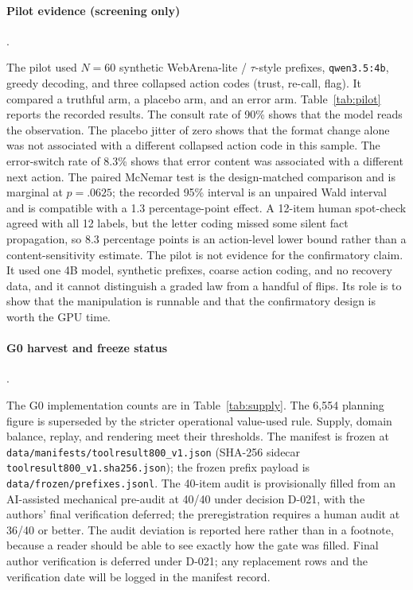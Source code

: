 \documentclass[a4paper,fleqn]{cas-sc}
\begin{document}
\paragraph{Pilot evidence (screening only)}.\ \label{sec:pilot}

The pilot used $N=60$ synthetic WebArena-lite / $\tau$-style prefixes, \texttt{qwen3.5:4b}, greedy
decoding, and three collapsed action codes (trust, re-call, flag). It compared a truthful arm, a
placebo arm, and an error arm. Table~\ref{tab:pilot} reports the recorded results. The consult
rate of 90\% shows that the model reads the observation. The placebo jitter of zero shows that
the format change alone was not associated with a different collapsed action code in this sample. The error-switch
rate of 8.3\% shows that error content was associated with a different next action. The paired McNemar test is the
design-matched comparison and is marginal at $p=.0625$; the recorded 95\% interval is an unpaired
Wald interval and is compatible with a 1.3 percentage-point effect. A 12-item human spot-check
agreed with all 12 labels, but the letter coding missed some silent fact propagation, so 8.3
percentage points is an action-level lower bound rather than a content-sensitivity estimate.
The pilot is not evidence for the confirmatory claim. It used one 4B model, synthetic prefixes,
coarse action coding, and no recovery data, and it cannot distinguish a graded law from a handful
of flips. Its role is to show that the manipulation is runnable and that the confirmatory design
is worth the GPU time.


\paragraph{G0 harvest and freeze status}.\

The G0 implementation counts are in Table~\ref{tab:supply}. The 6{,}554 planning figure is
superseded by the stricter operational value-used rule. Supply, domain balance, replay, and
rendering meet their thresholds. The manifest is frozen at
\texttt{data/manifests/toolresult800\_v1.json} (SHA-256 sidecar
\texttt{toolresult800\_v1.sha256.json}); the frozen prefix payload is
\texttt{data/frozen/prefixes.jsonl}. The 40-item audit is provisionally filled from an AI-assisted
mechanical pre-audit at 40/40 under decision D-021, with the authors' final verification deferred;
the preregistration requires a human audit at 36/40 or better. The audit deviation is reported
here rather than in a footnote, because a reader should be able to see exactly how the gate was
filled. Final author verification is deferred under D-021; any replacement rows and the
verification date will be logged in the manifest record.
\end{document}
